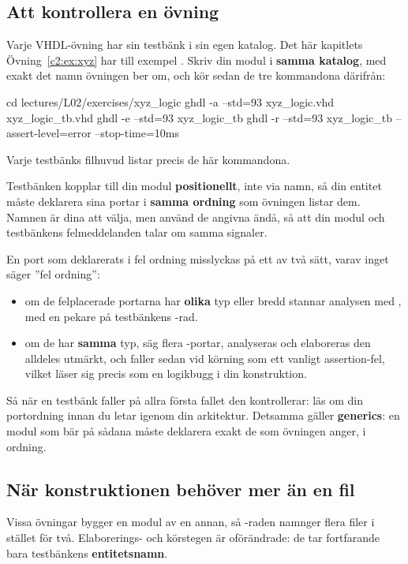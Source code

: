 \subsection{Att kontrollera en övning}
\label{c2:sub:exercise}
Varje VHDL-övning har sin testbänk i sin egen katalog. Det här kapitlets Övning~\ref{c2:ex:xyz}
har till exempel . Skriv din modul i
\textbf{samma katalog}, med exakt det namn övningen ber om, och kör sedan de tre kommandona
därifrån:

\begin{shell}
cd lectures/L02/exercises/xyz_logic
ghdl -a --std=93 xyz_logic.vhd xyz_logic_tb.vhd
ghdl -e --std=93 xyz_logic_tb
ghdl -r --std=93 xyz_logic_tb --assert-level=error --stop-time=10ms
\end{shell}

Varje testbänks filhuvud listar precis de här kommandona.

Testbänken kopplar till din modul \textbf{positionellt}, inte via namn, så din entitet måste
deklarera sina portar i \textbf{samma ordning} som övningen listar dem. Namnen är dina att välja,
men använd de angivna ändå, så att din modul och testbänkens felmeddelanden talar om samma
signaler.

En port som deklarerats i fel ordning misslyckas på ett av två sätt, varav inget säger ”fel
ordning”:
\begin{itemize}
  \item om de felplacerade portarna har \textbf{olika} typ eller bredd stannar analysen med
    , med en pekare på testbänkens
    -rad.
  \item om de har \textbf{samma} typ, säg flera -portar, analyseras och elaboreras
    den alldeles utmärkt, och faller sedan vid körning som ett vanligt assertion-fel, vilket läser
    sig precis som en logikbugg i din konstruktion.
\end{itemize}

Så när en testbänk faller på allra första fallet den kontrollerar: läs om din portordning innan du
letar igenom din arkitektur. Detsamma gäller \textbf{generics}: en modul som bär på sådana måste
deklarera exakt de som övningen anger, i ordning.

\subsection{När konstruktionen behöver mer än en fil}
\label{c2:sub:multifile}
Vissa övningar bygger en modul av en annan, så -raden namnger flera filer i stället
för två. Elaborerings- och körstegen är oförändrade: de tar fortfarande bara testbänkens
\textbf{entitetsnamn}.

